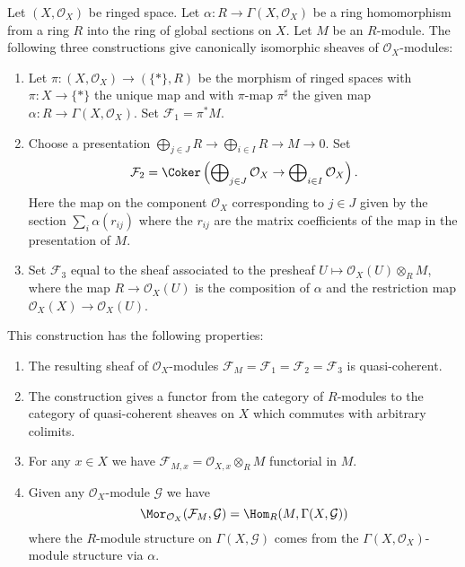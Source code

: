 \begin{lemma}
\label{lemma-construct-quasi-coherent-sheaves}
Let $(X, \mathcal{O}_X)$ be ringed space.
Let $\alpha : R \to \Gamma(X, \mathcal{O}_X)$ be a ring homomorphism from
a ring $R$ into the ring of global sections on $X$.
Let $M$ be an $R$-module.
The following three constructions give canonically isomorphic
sheaves of $\mathcal{O}_X$-modules:
\begin{enumerate}
\item Let $\pi : (X, \mathcal{O}_X) \longrightarrow (\{*\}, R)$
be the morphism of ringed spaces with $\pi : X \to \{*\}$
the unique map and with $\pi$-map $\pi^\sharp$ the given map
$\alpha : R \to \Gamma(X, \mathcal{O}_X)$. Set $\mathcal{F}_1 = \pi^*M$.
\item Choose a presentation
$\bigoplus_{j \in J} R \to \bigoplus_{i \in I} R \to M \to 0$.
Set
$$
\mathcal{F}_2 = \Coker\left(
\bigoplus\nolimits_{j \in J} \mathcal{O}_X
\to
\bigoplus\nolimits_{i \in I} \mathcal{O}_X
\right).
$$
Here the map on the component $\mathcal{O}_X$ corresponding to $j \in J$
given by the section $\sum_i \alpha(r_{ij})$ where the $r_{ij}$
are the matrix coefficients of the map in the presentation of $M$.
\item Set $\mathcal{F}_3$ equal to the sheaf associated to the presheaf
$U \mapsto \mathcal{O}_X(U) \otimes_R M$, where the map
$R \to \mathcal{O}_X(U)$ is the composition of $\alpha$ and
the restriction map $\mathcal{O}_X(X) \to \mathcal{O}_X(U)$.
\end{enumerate}
This construction has the following properties:
\begin{enumerate}
\item The resulting sheaf of $\mathcal{O}_X$-modules
$\mathcal{F}_M = \mathcal{F}_1 = \mathcal{F}_2 = \mathcal{F}_3$
is quasi-coherent.
\item The construction gives a functor from
the category of $R$-modules to the category of quasi-coherent
sheaves on $X$ which commutes with arbitrary colimits.
\item For any $x \in X$ we have
$\mathcal{F}_{M, x} = \mathcal{O}_{X, x} \otimes_R M$
functorial in $M$.
\item Given any $\mathcal{O}_X$-module
$\mathcal{G}$ we have
$$
\Mor_{\mathcal{O}_X}(\mathcal{F}_M, \mathcal{G})
=
\Hom_R(M, \Gamma(X, \mathcal{G}))
$$
where the $R$-module structure on $\Gamma(X, \mathcal{G})$
comes from the $\Gamma(X, \mathcal{O}_X)$-module structure via
$\alpha$.
\end{enumerate}
\end{lemma}

